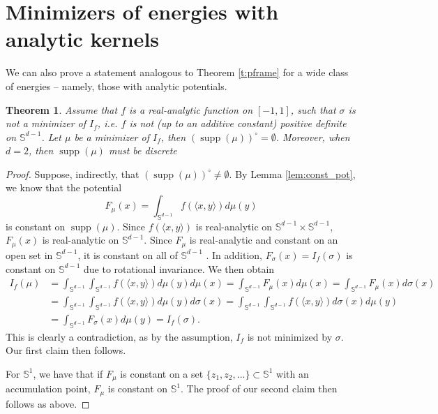 \documentclass[11pt, leqno]{amsart}
\def\S{\mathbb S}
\newtheorem{theorem}{Theorem}[section]
\theoremstyle{definition}
\numberwithin{equation}{section}
\begin{document}
\section{Minimizers of  energies with analytic kernels}\label{sec:analytic}
We can also prove a statement analogous to Theorem \ref{t:pframe} for  a wide class of energies -- namely, those with analytic potentials. 

\begin{theorem}\label{Analytic_supp}
Assume that  $f$ is a real-analytic  function on $[-1,1]$, such that $\sigma $ is not a minimizer of $I_f$, i.e. $f$ is not (up to an additive constant) positive definite on $\mathbb{S}^{d-1}$. Let  $\mu$ be a minimizer of $I_{f}$, then $(\operatorname{supp}(\mu))^{\circ} = \emptyset$. Moreover, when $d =2$, then $\operatorname{supp}(\mu)$ must be discrete
\end{theorem}

\begin{proof}

Suppose, indirectly, that $(\operatorname{supp}(\mu))^{\circ} \neq \emptyset$. By Lemma \ref{lem:const_pot}, we know that the potential
$$F_{\mu}(x) = \int_{ \mathbb{S}^{d-1}} f( \langle x , y \rangle) d \mu(y)$$
is constant on $\operatorname{supp}(\mu)$. Since $f(\langle x, y \rangle)$ is real-analytic on $\mathbb{S}^{d-1} \times \mathbb{S}^{d-1}$, $F_{\mu}(x)$ is real-analytic on $\mathbb{S}^{d-1}$. Since $F_\mu$ is real-analytic and constant on an open set in $\mathbb{S}^{d-1}$, it is constant on all of $\mathbb{S}^{d-1}$ \cite[Lemma 2.4]{quinto97}. In addition, $F_\sigma (x) = I_f (\sigma)$ is constant on $\S^{d-1}$ due to rotational invariance. We then obtain
\begin{align*}
I_f(\mu) & = \int_{ \mathbb{S}^{d-1}} \int_{\mathbb{S}^{d-1}} f( \langle x, y \rangle ) d \mu(y) d\mu(x) = \int_{ \mathbb{S}^{d-1}} F_{\mu}(x) d\mu(x)  = \int_{ \mathbb{S}^{d-1}} F_{\mu}(x) d\sigma(x) \\
& = \int_{ \mathbb{S}^{d-1}} \int_{\mathbb{S}^{d-1}} f( \langle x, y \rangle ) d \mu(y) d\sigma(x) = \int_{ \mathbb{S}^{d-1}} \int_{\mathbb{S}^{d-1}} f( \langle x, y \rangle ) d\sigma(x) d \mu(y) \\ 
&  = \int_{ \mathbb{S}^{d-1}} F_\sigma (x)  d \mu(y)   = I_f( \sigma).
\end{align*}
This is clearly a contradiction, as by the assumption, 
$I_f $ is not minimized by $\sigma$. Our first claim then follows.

For $\mathbb{S}^1$, we have that if $F_\mu$ is constant on a set $\{ z_1, z_2, ... \} \subset \mathbb{S}^1$ with an accumulation point, $F_\mu$ is constant on $\mathbb{S}^1$. The proof of our second claim then follows as above.
\end{proof}
\end{document}

